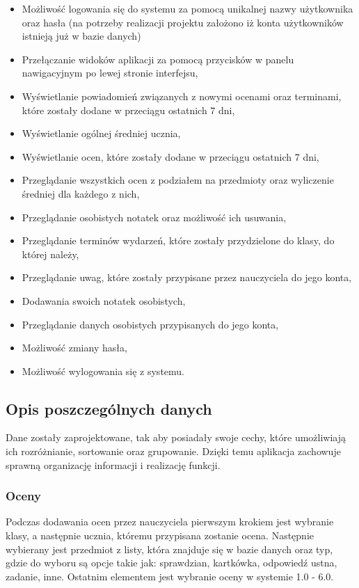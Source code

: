 \begin{itemize}
      \item Możliwość logowania się do systemu za pomocą unikalnej nazwy użytkownika oraz hasła (na potrzeby realizacji projektu założono iż konta użytkowników istnieją już w bazie danych)
      \item Przełączanie widoków aplikacji za pomocą przycisków w panelu nawigacyjnym po lewej stronie interfejsu,
      \item Wyświetlanie powiadomień związanych z nowymi ocenami oraz terminami, które zostały dodane w przeciągu ostatnich 7 dni,
      \item Wyświetlanie ogólnej średniej ucznia,
      \item Wyświetlanie ocen, które zostały dodane w przeciągu ostatnich 7 dni,
      \item Przeglądanie wszystkich ocen z podziałem na przedmioty oraz wyliczenie średniej dla każdego z nich,
      \item Przeglądanie osobistych notatek oraz możliwość ich usuwania,
      \item Przeglądanie terminów wydarzeń, które zostały przydzielone do klasy, do której należy,
      \item Przeglądanie uwag, które zostały przypisane przez nauczyciela do jego konta,
      \item Dodawania swoich notatek osobistych,
      \item Przeglądanie danych osobistych przypisanych do jego konta,
      \item Możliwość zmiany hasła,
      \item Możliwość wylogowania się z systemu.
\end{itemize}

\subsection{Opis poszczególnych danych}
\label{opisDanych}
Dane zostały zaprojektowane, tak aby posiadały swoje cechy, które umożliwiają ich rozróżnianie, sortowanie oraz grupowanie. Dzięki temu aplikacja zachowuje sprawną organizację informacji i realizację funkcji.


\subsubsection{Oceny}
\label{oceny}
Podczas dodawania ocen przez nauczyciela pierwszym krokiem jest wybranie klasy, a następnie ucznia, któremu przypisana zostanie ocena. Następnie wybierany jest przedmiot z listy, która znajduje się w bazie danych oraz typ, gdzie do wyboru są opcje takie jak: sprawdzian, kartkówka, odpowiedź ustna, zadanie, inne. Ostatnim elementem jest wybranie oceny w systemie 1.0 - 6.0. 

